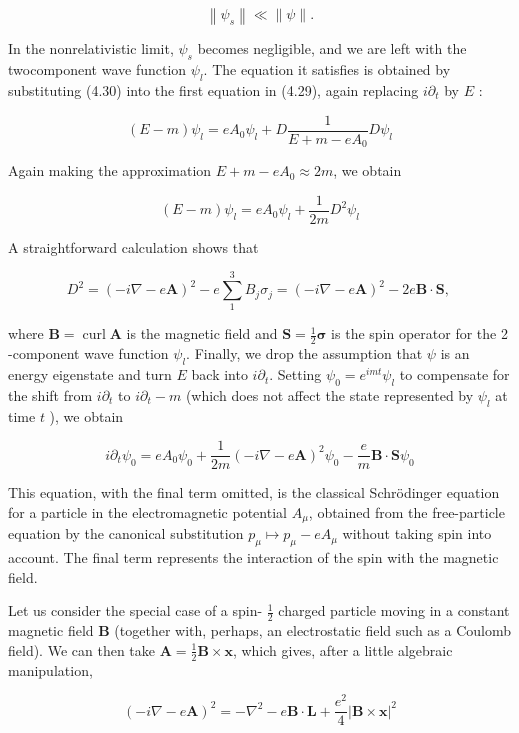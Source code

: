 \documentclass[10pt, letterpaper]{article}
\begin{document}
$$
\left\|\psi_{s}\right\| \ll\|\psi\| .
$$

In the nonrelativistic limit, $\psi_{s}$ becomes negligible, and we are left with the twocomponent wave function $\psi_{l}$. The equation it satisfies is obtained by substituting (4.30) into the first equation in (4.29), again replacing $i \partial_{t}$ by $E$ :

$$
(E-m) \psi_{l}=e A_{0} \psi_{l}+D \frac{1}{E+m-e A_{0}} D \psi_{l}
$$

Again making the approximation $E+m-e A_{0} \approx 2 m$, we obtain

$$
(E-m) \psi_{l}=e A_{0} \psi_{l}+\frac{1}{2 m} D^{2} \psi_{l}
$$

A straightforward calculation shows that

$$
D^{2}=(-i \nabla-e \mathbf{A})^{2}-e \sum_{1}^{3} B_{j} \sigma_{j}=(-i \nabla-e \mathbf{A})^{2}-2 e \mathbf{B} \cdot \mathbf{S} \text {, }
$$

where $\mathbf{B}=\operatorname{curl} \mathbf{A}$ is the magnetic field and $\mathbf{S}=\frac{1}{2} \boldsymbol{\sigma}$ is the spin operator for the 2 -component wave function $\psi_{l}$. Finally, we drop the assumption that $\psi$ is an energy eigenstate and turn $E$ back into $i \partial_{t}$. Setting $\psi_{0}=e^{i m t} \psi_{l}$ to compensate for the shift from $i \partial_{t}$ to $i \partial_{t}-m$ (which does not affect the state represented by $\psi_{l}$ at time $t$ ), we obtain

$$
i \partial_{t} \psi_{0}=e A_{0} \psi_{0}+\frac{1}{2 m}(-i \nabla-e \mathbf{A})^{2} \psi_{0}-\frac{e}{m} \mathbf{B} \cdot \mathbf{S} \psi_{0}
$$

This equation, with the final term omitted, is the classical Schrödinger equation for a particle in the electromagnetic potential $A_{\mu}$, obtained from the free-particle equation by the canonical substitution $p_{\mu} \mapsto p_{\mu}-e A_{\mu}$ without taking spin into account. The final term represents the interaction of the spin with the magnetic field.

Let us consider the special case of a spin- $\frac{1}{2}$ charged particle moving in a constant magnetic field $\mathbf{B}$ (together with, perhaps, an electrostatic field such as a Coulomb field). We can then take $\mathbf{A}=\frac{1}{2} \mathbf{B} \times \mathbf{x}$, which gives, after a little algebraic manipulation,

$$
(-i \nabla-e \mathbf{A})^{2}=-\nabla^{2}-e \mathbf{B} \cdot \mathbf{L}+\frac{e^{2}}{4}|\mathbf{B} \times \mathbf{x}|^{2}
$$
\end{document}
